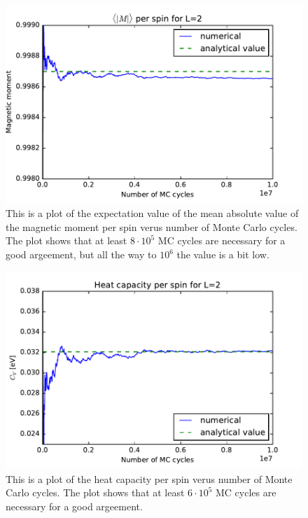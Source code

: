\begin{figure}[H]
\includegraphics[width=\linewidth]{../results/4b/L_2_magnetic_abs}\caption{This is a plot of the expectation value of the mean absolute value of the magnetic moment per spin verus number of Monte Carlo cycles. The plot shows that at least $ 8 \cdot 10^{5} $ MC cycles are necessary for a good argeement, but all the way to $10^6$ the value is a bit low.}\label{fig:L_2_magnetic_abs}
\end{figure}

\begin{figure}[H]
\includegraphics[width=\linewidth]{../results/4b/L_2_heat_capasity}\caption{This is a plot of the heat capacity per spin verus number of Monte Carlo cycles. The plot shows that at least $ 6 \cdot 10^{5} $ MC cycles are necessary for a good argeement.}\label{fig:L_2_heat_capacity}
\end{figure}

